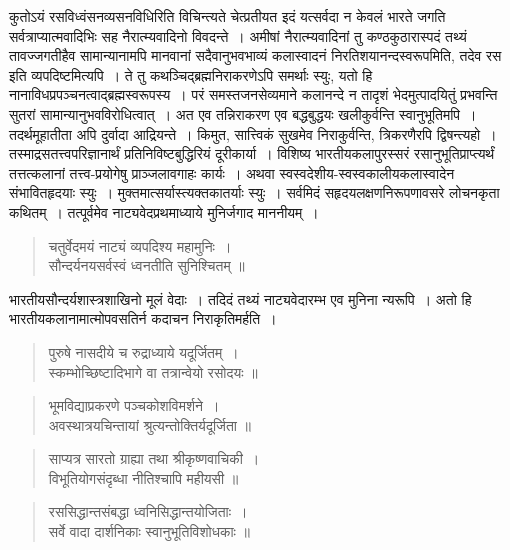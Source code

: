 {\dev कुतोऽयं रसविध्वंसनव्यसनविधिरिति विचिन्त्यते चेत्प्रतीयत इदं यत्सर्वदा न केवलं भारते जगति सर्वत्राप्यात्मवादिभिः सह नैरात्म्यवादिनो विवदन्ते~। अमीषां नैरात्म्यवादिनां तु कण्ठ\-कुठारास्पदं तथ्यं तावज्जगतीहैव सामान्यानामपि मानवानां सदैवानुभवभाव्यं कला\-स्वादनं निरतिशयानन्दस्वरूपमिति, तदेव रस इति व्यपदिष्टमित्यपि~। ते तु कथञ्चिद्ब्रह्मनिरा\-करणेऽपि समर्थाः स्युः, यतो हि नानाविधप्रपञ्चनत्वाद्ब्रह्मस्वरूपस्य~। परं समस्तजनसेव्यमाने कलानन्दे न तादृशं भेदमुत्पादयितुं प्रभवन्ति सुतरां सामान्यानुभवविरोधित्वात्~। अत एव तन्निराकरण एव बद्धबुद्धयः खलीकुर्वन्ति स्वानुभूतिमपि~। तदर्थमूहातीता अपि दुर्वादा आद्रियन्ते~। किमुत, सात्त्विकं सुखमेव निराकुर्वन्ति, त्रिकरणैरपि द्विषन्त्यहो~। तस्माद्रसतत्त्वपरिज्ञानार्थं  प्रतिनिविष्टबुद्धिरियं दूरीकार्या~। विशिष्य भारतीयकलापुरस्सरं रसानुभूतिप्राप्त्यर्थं तत्तत्कलानां तत्त्व-प्रयोगेषु प्राञ्जलावगाहः कार्यः~। अथवा स्वस्वदेशीय-स्वस्वकालीयकलास्वादेन संभा\-वितहृदयाः स्युः~। मुक्तमात्सर्यास्त्यक्तकातर्याः स्युः~। सर्वमिदं सहृदयलक्षणनिरूपणावसरे लोचनकृता कथितम्~। तत्पूर्वमेव नाट्यवेदप्रथमाध्याये मुनिर्जगाद माननीयम्~।}   
\begin{quote}
{\dev चतुर्वेदमयं नाट्यं व्यपदिश्य महामुनिः~।}\\
{\dev सौन्दर्यनयसर्वस्वं ध्वनतीति सुनिश्चितम् ॥}
\end{quote}

{\dev भारतीयसौन्दर्यशास्त्रशाखिनो मूलं वेदाः~। तदिदं तथ्यं नाट्यवेदारम्भ एव मुनिना न्यरूपि~। अतो हि भारतीयकलानामात्मोपवसतिर्न कदाचन निराकृतिमर्हति~।}
\begin{quote}
{\dev पुरुषे नासदीये च रुद्राध्याये यदूर्जितम्~।}\\
{\dev स्कम्भोच्छिष्टादिभागे वा तत्रान्वेयो रसोदयः ॥}
\end{quote}
\begin{quote}
{\dev भूमविद्याप्रकरणे पञ्चकोशविमर्शने~।}\\
{\dev अवस्थात्रयचिन्तायां श्रुत्यन्तोक्तिर्यदूर्जिता ॥}
\end{quote}
\begin{quote}
{\dev साप्यत्र सारतो ग्राह्या तथा श्रीकृष्णवाचिकी~।}\\
{\dev विभूतियोगसंदृब्धा नीतिश्चापि महीयसी ॥}
\end{quote}
\begin{quote}
{\dev रससिद्धान्तसंबद्धा ध्वनिसिद्धान्तयोजिताः~।}\\
{\dev सर्वे वादा दार्शनिकाः स्वानुभूतिविशोधकाः ॥}
\end{quote}

